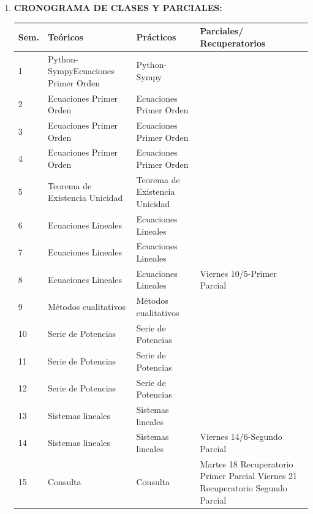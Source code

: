 \documentclass[12pt]{article}
\begin{document}
\begin{enumerate}
\item\textbf{CRONOGRAMA DE CLASES Y PARCIALES:}
\begin{table}[h]
\begin{tabular}{|m{0.6cm} |m{5cm}|m{5cm}|m{4.8cm}|}\hline
Sem.  & Teóricos & Prácticos & Parciales/ Recuperatorios\\\hline \hline
1   & Python-Sympy\newline Ecuaciones Primer Orden  &  Python-Sympy &   \\ \hline
  2 &  Ecuaciones Primer Orden  & Ecuaciones Primer Orden  &   \\ \hline
  3 &  Ecuaciones Primer Orden    &  Ecuaciones Primer Orden &   \\ \hline
   4 &  Ecuaciones Primer Orden    &  Ecuaciones Primer Orden &   \\ \hline
  5 & Teorema de Existencia Unicidad  &  Teorema de Existencia Unicidad   &   \\ \hline
  6 &   Ecuaciones Lineales   &  Ecuaciones Lineales   &   \\ \hline
  7 &  Ecuaciones Lineales   &  Ecuaciones Lineales &   \\ \hline

  8& Ecuaciones Lineales   &  Ecuaciones Lineales &  Viernes 10/5-Primer Parcial  \\ \hline

  9 & Métodos cualitativos & Métodos cualitativos   &   \\ \hline
  10 & Serie de Potencias  & Serie de Potencias  &   \\ \hline
  11 & Serie de Potencias   & Serie de Potencias  &   \\ \hline
   12 & Serie de Potencias   & Serie de Potencias  &   \\ \hline
  13 & Sistemas lineales  & Sistemas lineales  &   \\ \hline
  14 & Sistemas lineales & Sistemas lineales  &  Viernes 14/6-Segundo Parcial \\ \hline
  15  & Consulta & Consulta &  Martes 18 Recuperatorio Primer Parcial\newline
  Viernes 21 Recuperatorio Segundo Parcial \\ \hline

\end{tabular}
\end{table}

\end{enumerate}
















%
%
  
\end{document}
